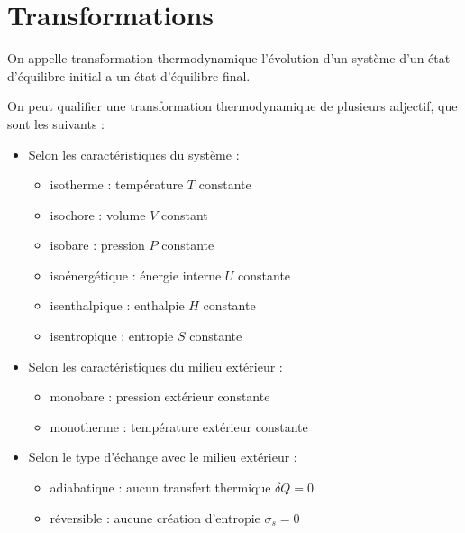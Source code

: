\section{Transformations}
\begin{defi}
    On appelle transformation thermodynamique l'évolution d'un système d'un état d'équilibre initial a un état d'équilibre final.
\end{defi}
On peut qualifier une transformation thermodynamique de plusieurs adjectif, que sont les suivants :\\
\begin{itemize}
    \item Selon les caractéristiques du système :
    \begin{multicols}{2}
    \begin{itemize}
    \item isotherme : température $T$ constante
    \item isochore : volume $V$ constant
    \item isobare : pression $P$ constante
    \item isoénergétique : énergie interne $U$ constante
    \item isenthalpique : enthalpie $H$ constante
    \item isentropique : entropie $S$ constante
    \end{itemize}
    \end{multicols}
    \item Selon les caractéristiques du milieu extérieur :
    \begin{multicols}{2}
    \begin{itemize}
    \item monobare : pression extérieur constante
    \item monotherme : température extérieur constante
    \end{itemize}
    \end{multicols}
    \item Selon le type d'échange avec le milieu extérieur :
    \begin{multicols}{2}
    \begin{itemize}
        \item adiabatique : aucun transfert thermique $\delta Q =0$
        \item réversible : aucune création d'entropie $\sigma_s = 0$
    \end{itemize}
    \end{multicols}
\end{itemize}

